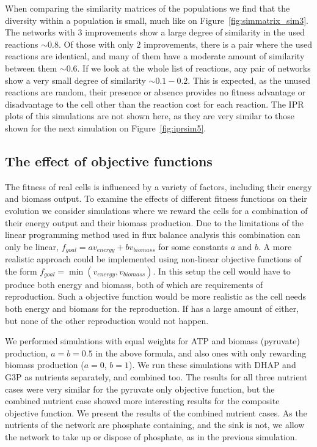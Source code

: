 \documentclass[a4paper,12pt]{article}
\begin{document}
When comparing the similarity matrices of the populations we find that the diversity within a population is small, much like on Figure~\ref{fig:simmatrix_sim3}. The networks with $3$ improvements show a large degree of similarity in the used reactions $\sim 0.8$. Of those with only $2$ improvements, there is a pair where the used reactions are identical, and many of them have a moderate amount of similarity between them $\sim 0.6$. If we look at the whole list of reactions, any pair of networks show a very small degree of similarity $\sim 0.1-0.2$. This is expected, as the unused reactions are random, their presence or absence provides no fitness advantage or disadvantage to the cell other than the reaction cost for each reaction. The IPR plots of this simulations are not shown here, as they are very similar to those shown for the next simulation on Figure~\ref{fig:iprsim5}. 

\subsection{The effect of objective functions}
\label{sub:goalfuncs}

The fitness of real cells is influenced by a variety of factors, including their energy and biomass output. To examine the effects of different fitness functions on their evolution we consider simulations where we reward the cells for a combination of their energy output and their biomass production. Due to the limitations of the linear programming method used in flux balance analysis this combination can only be linear, $f_{goal}=a v_{energy}+ b v_{biomass}$ for some constants $a$ and $b$. A more realistic approach could be implemented using non-linear objective functions of the form $f_{goal}=\min \left( v_{energy},v_{biomass} \right)$. In this setup the cell would have to produce both energy and biomass, both of which are requirements of reproduction. Such a objective function would be more realistic as the cell needs both energy and biomass for the reproduction. If has a large amount of either, but none of the other reproduction would not happen. 

We performed simulations with equal weights for ATP and biomass (pyruvate) production, $a=b=0.5$ in the above formula, and also ones with only rewarding biomass production ($a=0$, $b=1$). We run these simulations with DHAP and G3P as nutrients separately, and combined too. The results for all three nutrient cases were very similar for the pyruvate only objective function, but the combined nutrient case showed more interesting results for the composite objective function. We present the results of the combined nutrient cases. As the nutrients of the network are phosphate containing, and the sink is not, we allow the network to take up or dispose of phosphate, as in the previous simulation. 
\end{document}
